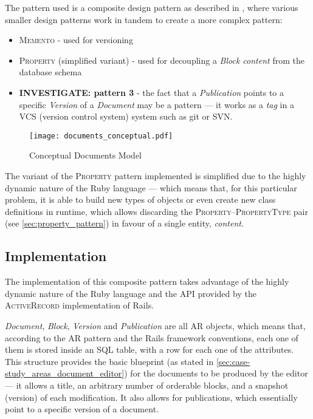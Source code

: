 The pattern used is a composite design pattern as described in \cite{riehle_composite_patterns}, where various smaller design patterns work in tandem to create a more complex pattern:

\begin{itemize}
  \item \textsc{Memento} - used for versioning
  \item \textsc{Property} (simplified variant) - used for decoupling a \emph{Block content} from the database schema
  \item \textbf{INVESTIGATE: pattern 3} - the fact that a \emph{Publication} points to a specific \emph{Version} of a \emph{Document} may be a pattern --- it works as a \emph{tag} in a VCS (version control system) system such as git or SVN.
\end{itemize}

\begin{figure}[H]
  \centering
  \texttt{[image: documents\_conceptual.pdf]}
  \caption{Conceptual Documents Model}
  \label{fig:documents_conceptual}
\end{figure}

The variant of the \textsc{Property} pattern implemented is simplified due to the highly dynamic nature of the Ruby language --- which means that, for this particular problem, it is able to build new types of objects or even create new class definitions in runtime, which allows discarding the \textsc{Property}--\textsc{PropertyType} pair (see \ref{sec:property_pattern}) in favour of a single entity, \emph{content}.

\subsection{Implementation}\label{sec:fa_documents_implementation}

The implementation of this composite pattern takes advantage of the highly dynamic nature of the Ruby language and the API provided by the \textsc{ActiveRecord} implementation of Rails.

\emph{Document}, \emph{Block}, \emph{Version} and \emph{Publication} are all AR objects, which means that, according to the AR pattern and the Rails framework conventions, each one of them is stored inside an SQL table, with a row for each one of the attributes. This structure provides the basic blueprint (as stated in \ref{sec:case-study_areas_document_editor}) for the documents to be produced by the editor --- it allows a title, an arbitrary number of orderable blocks, and a snapshot (version) of each modification. It also allows for publications, which essentially point to a specific version of a document.

